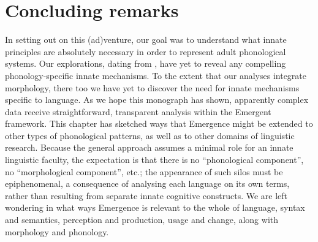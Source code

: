 \section{Concluding remarks}
In setting out on this (ad)venture, our goal was to understand what innate principles are absolutely necessary in order to represent adult phonological systems. Our explorations, dating from \citet{Pulleyblank:2006cls, Pulleyblank:2006wccfl, Mohanan+:2010}, have yet to reveal any compelling phonology-specific innate mechanisms. To the extent that our analyses integrate morphology, there too we have yet to discover the need for  innate mechanisms specific to language. As we hope this monograph has shown, apparently complex data receive straightforward, transparent analysis within the Emergent framework. This chapter has sketched ways that Emergence might be extended to other types of phonological patterns, as well as to other domains of linguistic research. Because the general approach assumes a minimal  role for an innate linguistic faculty, the expectation is that there is no ``phonological component'', no ``morphological component'', etc.; the appearance of such silos must be epiphenomenal, a consequence of analysing each language on its own terms, rather than resulting from separate innate cognitive constructs. We are left wondering in what ways Emergence is relevant to the whole of language, syntax and semantics, perception and production, usage and change, along with morphology and phonology. 

